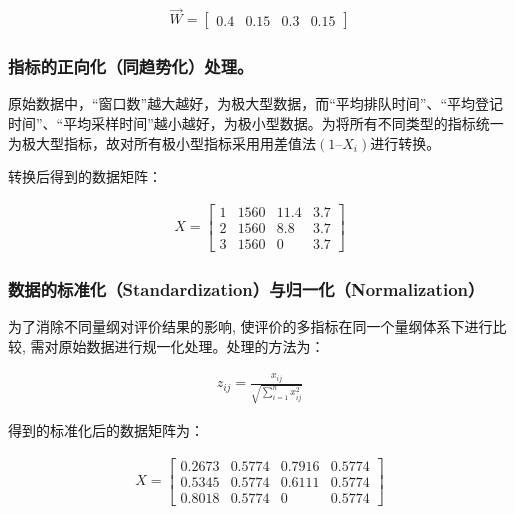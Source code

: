 \documentclass[
  journal=,
  manuscript=,
  year=2022,
  volume=01,
]{cup-journal}
\begin{document}
\begin{equation}
	\begin{aligned}
		\overrightarrow{W}=
		\begin{bmatrix}
			0.4 & 0.15 & 0.3 & 0.15
		\end{bmatrix}
	\end{aligned}
\end{equation}

\subsubsection{指标的正向化（同趋势化）处理。}

\par 原始数据中，“窗口数”越大越好，为极大型数据，而“平均排队时间”、“平均登记时间”、“平均采样时间”越小越好，为极小型数据。为将所有不同类型的指标统一为极大型指标，故对所有极小型指标采用用差值法$(1–X_{i})$进行转换。
\par 转换后得到的数据矩阵：

\begin{equation}
	\begin{aligned}
		X=
		\begin{bmatrix}
			1 & 1560 & 11.4 & 3.7 \\
			2 & 1560 & 8.8 & 3.7 \\
			3 & 1560 & 0 & 3.7
		\end{bmatrix}
	\end{aligned}
\end{equation}

\subsubsection{数据的标准化（Standardization）与归一化（Normalization）}

\par 为了消除不同量纲对评价结果的影响, 使评价的多指标在同一个量纲体系下进行比较, 需对原始数据进行规一化处理。处理的方法为：

\begin{equation}
	\begin{aligned}
		z_{ij}=\frac{x_{ij}}{\sqrt{\sum_{i=1}^{n} x_{ij}^{2} } }
	\end{aligned}
\end{equation}

\par 得到的标准化后的数据矩阵为：

\begin{equation}
	\begin{aligned}
		X=
		\begin{bmatrix}
			0.2673 & 0.5774 & 0.7916 & 0.5774 \\
			0.5345 & 0.5774 & 0.6111 & 0.5774 \\
			0.8018 & 0.5774 & 0 & 0.5774
		\end{bmatrix}
	\end{aligned}
\end{equation}
\end{document}
